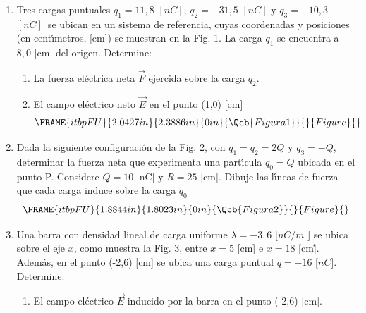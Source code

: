 \documentclass[onecolumn]{article}
\begin{document}
\begin{enumerate}
\item Tres cargas puntuales $q_{1}=11,8$ $[nC]$, $q_{2}=-31,5$ $[nC]$ y $%
q_{3}=-10,3$ $[nC]$\ se ubican en un sistema de referencia, cuyas
coordenadas y posiciones (en cent\'{\i}metros, [cm]) se muestran en la Fig.
1. La carga $q_{1}$ se encuentra a $8,0$ [cm] del origen. Determine:

\begin{enumerate}
\item La fuerza el\'{e}ctrica neta $\vec{F}$ ejercida sobre la carga $q_{2}.$

\item El campo el\'{e}ctrico neto $\vec{E}$ en el punto (1,0) [cm]%
\begin{equation*}
\FRAME{itbpFU}{2.0427in}{2.3886in}{0in}{\Qcb{Figura 1}}{}{Figure}{\special%
{language "Scientific Word";type "GRAPHIC";maintain-aspect-ratio
TRUE;display "USEDEF";valid_file "T";width 2.0427in;height 2.3886in;depth
0in;original-width 7.4149in;original-height 8.6836in;cropleft "0";croptop
"1";cropright "1";cropbottom "0";tempfilename
'TCTPZ400.bmp';tempfile-properties "XPR";}}
\end{equation*}
\end{enumerate}

\item Dada la siguiente configuraci\'{o}n de la Fig. 2, con $q_{1}=q_{2}=2Q$
y $q_{3}=-Q$, determinar la fuerza neta que experimenta una part\'{\i}cula $%
q_{0}=Q$ ubicada en el punto P. Considere $Q=10$ [nC] y $R=25$ [cm]. Dibuje
las l\'{\i}neas de fuerza que cada carga induce sobre la carga $q_{0}$%
\begin{equation*}
\FRAME{itbpFU}{1.8844in}{1.8023in}{0in}{\Qcb{Figura 2}}{}{Figure}{\special%
{language "Scientific Word";type "GRAPHIC";maintain-aspect-ratio
TRUE;display "USEDEF";valid_file "T";width 1.8844in;height 1.8023in;depth
0in;original-width 2.3644in;original-height 2.2606in;cropleft "0";croptop
"1";cropright "1";cropbottom "0";tempfilename
'TCTQ5G01.wmf';tempfile-properties "XPR";}}
\end{equation*}%
\pagebreak 

\item Una barra con densidad lineal de carga uniforme $\lambda =-3,6$ [$nC/m$%
] se ubica sobre el eje $x$, como muestra la Fig. 3, entre $x=5$ [cm] e $x=18
$ [cm\.{]}. Adem\'{a}s, en el punto (-2,6) [cm] se ubica una carga puntual $%
q=-16$ [$nC$]. Determine:

\begin{enumerate}
\item El campo el\'{e}ctrico $\vec{E}$ inducido por la barra en el punto
(-2,6) [cm].


\end{enumerate}
\end{enumerate}
\end{document}
